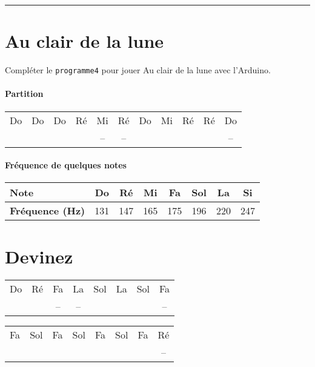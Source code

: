 \documentclass[12pt,a4paper]{article}
\begin{document}
\hrule{}

\section*{Au clair de la lune}

Compléter le \texttt{programme4} pour jouer \og Au clair de la lune \fg{} avec l'Arduino.

\paragraph{Partition}

\begin{center}
\begin{tabular}{|ccccccccccc|}
\hline
Do 		& Do 		& Do 		& Ré 		& Mi 		& Ré 		& Do 		& Mi 		& Ré 		& Ré 		& Do \\
\cdot	& \cdot	& \cdot	& \cdot	& --			& --			& \cdot	& \cdot	& \cdot	& \cdot	& -- \\
\hline
\end{tabular}
\end{center}

\paragraph{Fréquence de quelques notes}

\begin{center}
\begin{tabular}{l|c|c|c|c|c|c|c}
\textbf{Note}						& \textbf{Do} & \textbf{Ré} & \textbf{Mi} & \textbf{Fa} & \textbf{Sol} & \textbf{La} & \textbf{Si} \\
\hline
\textbf{Fréquence (Hz)} 	& 131 & 147 & 165 & 175 & 196 & 220 & 247 \\
\end{tabular}
\end{center}

\section*{Devinez}

\begin{center}
\begin{tabular}{|cccccccc|}
\hline
Do 		& Ré 		& Fa 		& La 		& Sol		& La 		& Sol		& Fa 		\\
\cdot	& \cdot	& --			& --			& \cdot	& \cdot	& \cdot	& --	\\
\hline
\end{tabular}
\begin{tabular}{|cccccccc|}
\hline
Fa 		& Sol 		& Fa 		& Sol 		& Fa		& Sol 		& Fa		& Ré 		\\
\cdot	& \cdot	& \cdot	& \cdot	& \cdot	& \cdot	& \cdot	& --	\\
\hline
\end{tabular}
\end{center}
\end{document}
